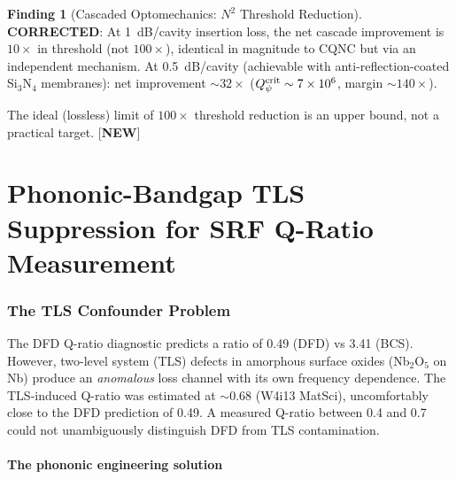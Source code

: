 \documentclass[11pt]{article}
\newcommand{\ee}[1]{\times 10^{#1}}
\newcommand{\Qpsi}{Q_\psi}
\theoremstyle{definition}
\newtheorem{finding}[theorem]{Finding}
\theoremstyle{remark}
\begin{document}
\begin{finding}[Cascaded Optomechanics: $N^2$ Threshold Reduction]
\textbf{CORRECTED}: At 1~dB/cavity insertion loss, the net
cascade improvement is $10\times$ in threshold (not $100\times$),
identical in magnitude to CQNC but via an independent mechanism.
At 0.5~dB/cavity (achievable with anti-reflection-coated Si$_3$N$_4$
membranes): net improvement $\sim 32\times$ ($\Qpsi^{\rm crit}
\sim 7\ee{6}$, margin $\sim 140\times$).

The ideal (lossless) limit of $100\times$ threshold reduction is
an upper bound, not a practical target.
[\textbf{NEW}]
\end{finding}


\part{Phononic-Bandgap TLS Suppression for SRF Q-Ratio Measurement}
\label{part:phononic_TLS}


\section{The TLS Confounder Problem}
\label{sec:TLS_problem}

The DFD Q-ratio diagnostic predicts a ratio of 0.49 (DFD) vs 3.41
(BCS). However, two-level system (TLS) defects in amorphous surface
oxides (Nb$_2$O$_5$ on Nb) produce an \emph{anomalous} loss channel
with its own frequency dependence. The TLS-induced Q-ratio was
estimated at $\sim 0.68$ (W4i13 MatSci), uncomfortably close to
the DFD prediction of 0.49. A measured Q-ratio between 0.4 and 0.7
could not unambiguously distinguish DFD from TLS contamination.

\subsection{The phononic engineering solution}
\end{document}
